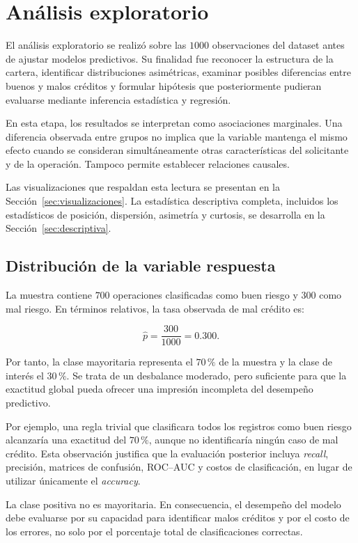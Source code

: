 \section{Análisis exploratorio}
\label{sec:eda}

El análisis exploratorio se realizó sobre las \(1000\) observaciones del
dataset antes de ajustar modelos predictivos. Su finalidad fue reconocer
la estructura de la cartera, identificar distribuciones asimétricas,
examinar posibles diferencias entre buenos y malos créditos y formular
hipótesis que posteriormente pudieran evaluarse mediante inferencia
estadística y regresión.

En esta etapa, los resultados se interpretan como asociaciones
marginales. Una diferencia observada entre grupos no implica que la
variable mantenga el mismo efecto cuando se consideran simultáneamente
otras características del solicitante y de la operación. Tampoco permite
establecer relaciones causales.

Las visualizaciones que respaldan esta lectura se presentan en la
Sección~\ref{sec:visualizaciones}. La estadística descriptiva completa,
incluidos los estadísticos de posición, dispersión, asimetría y curtosis,
se desarrolla en la Sección~\ref{sec:descriptiva}.

\subsection{Distribución de la variable respuesta}

La muestra contiene \(700\) operaciones clasificadas como buen riesgo y
\(300\) como mal riesgo. En términos relativos, la tasa observada de mal
crédito es:

\[
\widehat{p}
=
\frac{300}{1000}
=
0.300.
\]

Por tanto, la clase mayoritaria representa el \(70\,\%\) de la muestra y
la clase de interés el \(30\,\%\). Se trata de un desbalance moderado,
pero suficiente para que la exactitud global pueda ofrecer una impresión
incompleta del desempeño predictivo.

Por ejemplo, una regla trivial que clasificara todos los registros como
buen riesgo alcanzaría una exactitud del \(70\,\%\), aunque no
identificaría ningún caso de mal crédito. Esta observación justifica que
la evaluación posterior incluya \textit{recall}, precisión, matrices de
confusión, ROC--AUC y costos de clasificación, en lugar de utilizar
únicamente el \textit{accuracy}.

\begin{hallazgo}
La clase positiva no es mayoritaria. En consecuencia, el desempeño del
modelo debe evaluarse por su capacidad para identificar malos créditos y
por el costo de los errores, no solo por el porcentaje total de
clasificaciones correctas.
\end{hallazgo}

